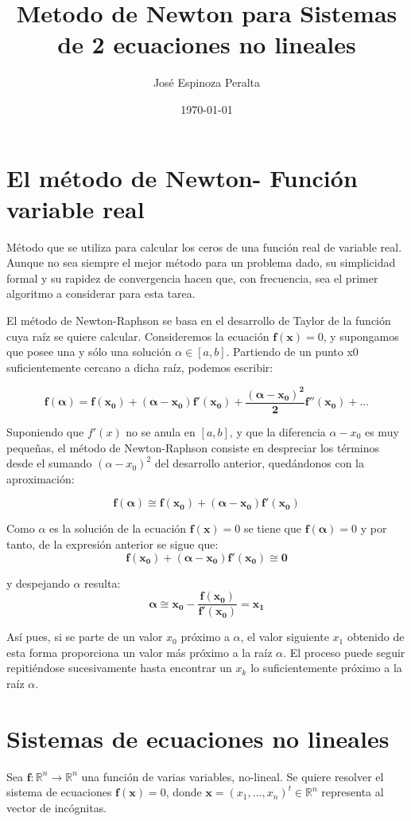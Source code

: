 \documentclass[10pt,a4paper]{article}
\begin{document}
\author{José Espinoza Peralta}
\title{Metodo de Newton para Sistemas de 2 ecuaciones no lineales}
\date{\small{\today}}
\maketitle

\tableofcontents

\newpage
\section{El método de Newton- Función variable real}
Método que se utiliza para calcular los ceros de una función real de variable real. Aunque no sea siempre el mejor método para un problema dado, su simplicidad formal y su rapidez de convergencia hacen que, con frecuencia, sea el primer algoritmo a considerar para esta tarea.

El método de Newton-Raphson se basa en el desarrollo de Taylor de la función cuya raíz se quiere calcular. Consideremos la ecuación $\boldsymbol{f(x)}=0$, y supongamos que posee una y sólo una solución $\alpha \in [a,b]$. Partiendo de un punto x0 suficientemente cercano a dicha raíz, podemos escribir: 
 
$$\boldsymbol{f(\alpha)=f(x_{0})+(\alpha-x_{0})f'(x_{0})+\frac{(\alpha-x_{0})^{2}}{2}f''(x_{0})+...}$$

Suponiendo que $f'(x)$ no se anula en $[a,b]$, y que la diferencia $\alpha-x_{0}$ es muy pequeñas, el método de Newton-Raphson consiste en despreciar los términos desde el sumando $(\alpha-x_{0})^{2}$ del desarrollo anterior, quedándonos con la aproximación: 

$$\boldsymbol{f(\alpha)\cong f(x_{0})+(\alpha-x_{0})f'(x_{0})}$$

Como $\alpha$ es la solución de la ecuación $\boldsymbol{f(x)}=0$ se tiene que $\boldsymbol{f(\alpha)}=0$ y por tanto, de la expresión anterior se sigue que: 
$$\boldsymbol{f(x_{0})+(\alpha-x_{0})f'(x_{0})\cong 0}$$

y despejando $\alpha$ resulta: 
$$\boldsymbol{\alpha \cong x_{0} -\frac{f(x_{0})}{f'(x_{0})}= x_{1}}$$

Así pues, si se parte de un valor $x_{0}$ próximo a $\alpha$, el valor siguiente $x_{1}$ obtenido de esta forma proporciona un valor más próximo a la raíz $\alpha$.
El proceso puede seguir repitiéndose sucesivamente hasta encontrar un $x_{k}$ lo suficientemente próximo a la raíz $\alpha$.

\section{Sistemas de ecuaciones no lineales}
Sea $\boldsymbol{f}:\mathbb{R}^{n}\rightarrow \mathbb{R}^{n}$ una función de varias variables, no-lineal. Se quiere resolver el sistema de ecuaciones $\boldsymbol{f(x)}=0$, donde $\boldsymbol{x}=(x_{1},...,x_{n})^{t} \in \mathbb{R}^{n}$ representa al vector de incógnitas. 
\end{document}
